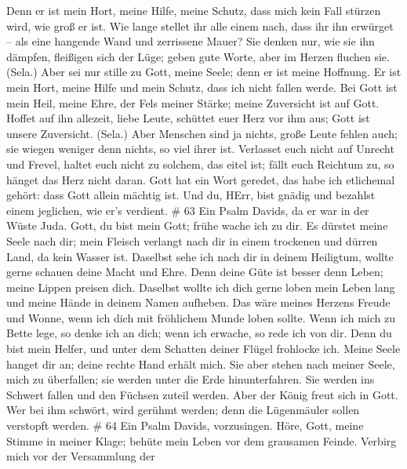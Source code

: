 Denn er ist mein Hort, meine Hilfe, meine Schutz, dass mich kein Fall
stürzen wird, wie groß er ist.  Wie lange stellet ihr alle
einem nach, dass ihr ihn erwürget -- als eine hangende Wand und
zerrissene Mauer?  Sie denken nur, wie sie ihn dämpfen,
fleißigen sich der Lüge; geben gute Worte, aber im Herzen fluchen sie.
(Sela.)  Aber sei nur stille zu Gott, meine Seele; denn er
ist meine Hoffnung.  Er ist mein Hort, meine Hilfe und mein
Schutz, dass ich nicht fallen werde.  Bei Gott ist mein
Heil, meine Ehre, der Fels meiner Stärke; meine Zuversicht ist auf Gott.
 Hoffet auf ihn allezeit, liebe Leute, schüttet euer Herz
vor ihm aus; Gott ist unsere Zuversicht. (Sela.)  Aber
Menschen sind ja nichts, große Leute fehlen auch; sie wiegen weniger
denn nichts, so viel ihrer ist.  Verlasset euch nicht auf
Unrecht und Frevel, haltet euch nicht zu solchem, das eitel ist; fällt
euch Reichtum zu, so hänget das Herz nicht daran.  Gott hat
ein Wort geredet, das habe ich etlichemal gehört: dass Gott allein
mächtig ist.  Und du, HErr, bist gnädig und bezahlst einem
jeglichen, wie er's verdient. \# 63  Ein Psalm Davids, da er
war in der Wüste Juda.  Gott, du bist mein Gott; frühe wache
ich zu dir. Es dürstet meine Seele nach dir; mein Fleisch verlangt nach
dir in einem trockenen und dürren Land, da kein Wasser ist. 
Daselbst sehe ich nach dir in deinem Heiligtum, wollte gerne schauen
deine Macht und Ehre.  Denn deine Güte ist besser denn
Leben; meine Lippen preisen dich.  Daselbst wollte ich dich
gerne loben mein Leben lang und meine Hände in deinem Namen aufheben.
 Das wäre meines Herzens Freude und Wonne, wenn ich dich mit
fröhlichem Munde loben sollte.  Wenn ich mich zu Bette lege,
so denke ich an dich; wenn ich erwache, so rede ich von dir.
 Denn du bist mein Helfer, und unter dem Schatten deiner
Flügel frohlocke ich.  Meine Seele hanget dir an; deine
rechte Hand erhält mich.  Sie aber stehen nach meiner
Seele, mich zu überfallen; sie werden unter die Erde hinunterfahren.
 Sie werden ins Schwert fallen und den Füchsen zuteil
werden.  Aber der König freut sich in Gott. Wer bei ihm
schwört, wird gerühmt werden; denn die Lügenmäuler sollen verstopft
werden. \# 64  Ein Psalm Davids, vorzusingen. 
Höre, Gott, meine Stimme in meiner Klage; behüte mein Leben vor dem
grausamen Feinde.  Verbirg mich vor der Versammlung der
